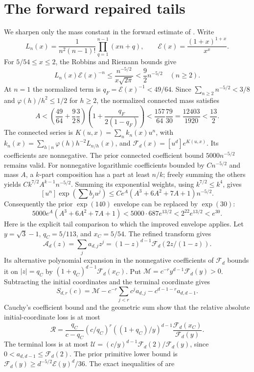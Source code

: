 \documentclass[11pt]{article}
\theoremstyle{remark}\newtheorem{remark}[theorem]{Remark}
\newcommand{\Fcal}{\mathcal F}
\newcommand{\EE}{\mathcal E}
\begin{document}
\section{The forward repaired tails}\label{sec:forward}
We sharpen only the mass constant in the forward estimate of
\cite[Lemmas 8.1--8.3 and Proposition 8.4]{decastro}.
Write
\[
 L_n(x)=\frac{1}{n^2(n-1)!}\prod_{q=1}^{n-1}(xn+q),
 \qquad \EE(x)=\frac{(1+x)^{1+x}}{x^x}.
\]
For $5/54\le x\le2$, the Robbins and Riemann bounds give
\[
 L_n(x)\EE(x)^{-n}\le\frac{n^{-5/2}}{x\sqrt{2\pi}}
 <\frac92n^{-5/2}\quad(n\ge2).
\]
At $n=1$ the normalized term is $q_F=\EE(x)^{-1}<49/64$.
Since $\sum_{n\ge2}n^{-5/2}<3/8$ and
$\varphi(h)/h^2\le1/2$ for $h\ge2$, the normalized connected mass satisfies
\[
 A<\left(\frac{49}{64}+\frac92\frac38\right)
       \left(1+\frac{q_F}{2(1-q_F)}\right)
 <\frac{157}{64}\frac{79}{30}=\frac{12403}{1920}<\frac{13}{2}.
\]
The connected series is $K(u,x)=\sum_n k_n(x)u^n$, with
$k_n(x)=\sum_{h\mid n}\varphi(h)h^{-2}L_{n/h}(x)$, and
$\Fcal_d(x)=[u^d]e^{K(u,x)}$. Its coefficients are nonnegative.
The prior connected coefficient bound $5000n^{-5/2}$ remains valid.
For nonnegative logarithmic coefficients bounded by $Cn^{-5/2}$ and mass
$A$, a $k$-part composition has a part at least $n/k$; freely summing the
others yields $Ck^{7/2}A^{k-1}n^{-5/2}$.
Summing its exponential weights, using $k^{7/2}\le k^4$, gives
\[
 [u^n]\exp\left(\sum b_ju^j\right)
 \le Ce^A(A^3+6A^2+7A+1)n^{-5/2}.
\]
Consequently the prior $\exp(140)$ envelope can be replaced by $\exp(30)$:
\[
 5000e^A(A^3+6A^2+7A+1)
 <5000\cdot687e^{13/2}<2^{22}e^{13/2}<e^{30}.
\]
Here is the explicit tail comparison to which the improved envelope applies.
Let $y=\sqrt3-1$, $q_C=5/113$, and $x_C=5/54$. The refined transform gives
\[
 \mathcal A_d(z)=\sum_j a_{d,j}z^j
 =(1-z)^{d-1}\Fcal_d(2z/(1-z)).
\]
Its alternative polynomial expansion in the nonnegative coefficients of
$\Fcal_d$ bounds it on $|z|=q_C$ by
$(1+q_C)^{d-1}\Fcal_d(x_C)$.
Put $\mathcal M=c^{-r}y^{d-1}\Fcal_d(y)>0$.
Subtracting the initial coordinates and the terminal coordinate gives
\[
 S_{d,r}(c)=\mathcal M-c^{-r}\sum_{j<r}c^ja_{d,j}
                  -c^{d-1-r}a_{d,d-1}.
\]
Cauchy's coefficient bound and the geometric sum show that the relative
absolute initial-coordinate loss is at most
\[
 \mathcal R=\frac{q_C}{c-q_C}(c/q_C)^r
       ((1+q_C)/y)^{d-1}\frac{\Fcal_d(x_C)}{\Fcal_d(y)}.
\]
The terminal loss is at most
$\mathcal U=(c/y)^{d-1}\Fcal_d(2)/\Fcal_d(y)$, since
$0<a_{d,d-1}\le\Fcal_d(2)$.
The prior primitive lower bound is
$\Fcal_d(y)\ge d^{-5/2}\EE(y)^d/36$.
The exact inequalities of \cite[Lemma 8.3]{decastro} are
\end{document}
